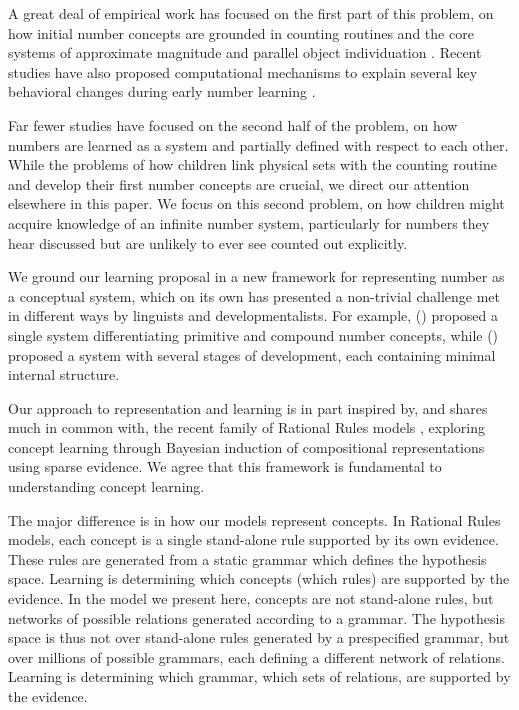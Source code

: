 \documentclass[10pt,letterpaper]{article}
\begin{document}
A great deal of empirical work has focused on the first part of this
problem, on how initial number concepts are grounded in counting
routines and the core systems of approximate magnitude and parallel
object individuation
\citep{Car2009,dehaene2011number,feigenson2004core}. Recent studies
have also proposed computational mechanisms to explain several key
behavioral changes during early number learning
\citep{PianGoodTen2012}.

Far fewer studies have focused on the second half of the problem, on
how numbers are learned as a system and partially defined with respect
to each other. While the problems of how children link physical sets
with the counting routine and develop their first number concepts are
crucial, we direct our attention elsewhere in this paper. We focus on
this second problem, on how children might acquire knowledge of an
infinite number system, particularly for numbers they hear discussed
but are unlikely to ever see counted out explicitly.

We ground our learning proposal in a new framework for representing
number as a conceptual system, which on its own has presented a
non-trivial challenge met in different ways by linguists and
developmentalists. For example, \citeauthor{hurford1975linguistic}
(\citeyear{hurford1975linguistic}) proposed a single system
differentiating primitive and compound number concepts, while
\citeauthor{siegler1982development}
(\citeyear{siegler1982development}) proposed a system with several
stages of development, each containing minimal internal structure.

Our approach to representation and learning is in part inspired by,
and shares much in common with, the recent family of Rational Rules
models
\citep{goodman2008rational,T.D.Ullman:2012:1b1b6,PianGoodTen2012},
exploring concept learning through Bayesian induction of compositional
representations using sparse evidence. We agree that this framework is
fundamental to understanding concept learning.

The major difference is in how our models represent concepts. In
Rational Rules models, each concept is a single stand-alone rule
supported by its own evidence. These rules are generated from a static
grammar which defines the hypothesis space. Learning is determining
which concepts (which rules) are supported by the evidence. In the
model we present here, concepts are not stand-alone rules, but
networks of possible relations generated according to a grammar. The
hypothesis space is thus not over stand-alone rules generated by a
prespecified grammar, but over millions of possible grammars, each
defining a different network of relations. Learning is determining
which grammar, which sets of relations, are supported by the evidence.
\end{document}
